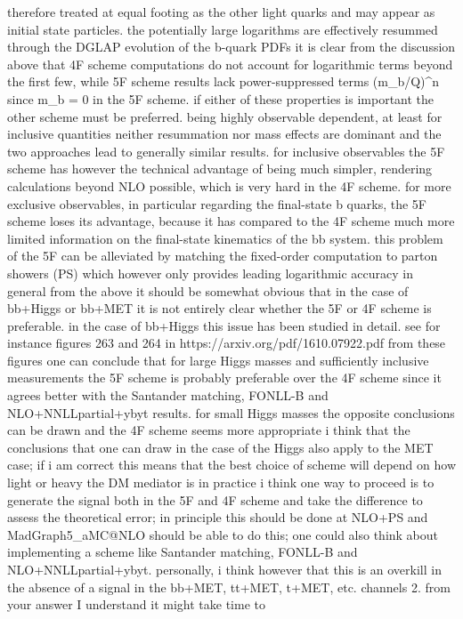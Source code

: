 {therefore treated at equal footing as the other light quarks and may
appear as initial state particles. the potentially large logarithms are
effectively resummed through the DGLAP evolution of the b-quark PDFs it
is clear from the discussion above that 4F scheme computations do not
account for logarithmic terms beyond the first few, while 5F scheme
results lack power-suppressed terms (m\_b/Q)\^{}n since m\_b = 0 in the
5F scheme. if either of these properties is important the other scheme
must be preferred. being highly observable dependent, at least for
inclusive quantities neither resummation nor mass effects are dominant
and the two approaches lead to generally similar results. for inclusive
observables the 5F scheme has however the technical advantage of being
much simpler, rendering calculations beyond NLO possible, which is very
hard in the 4F scheme. for more exclusive observables, in particular
regarding the final-state b quarks, the 5F scheme loses its advantage,
because it has compared to the 4F scheme much more limited information
on the final-state kinematics of the bb system. this problem of the 5F
can be alleviated by matching the fixed-order computation to parton
showers (PS) which however only provides leading logarithmic accuracy in
general from the above it should be somewhat obvious that in the case of
bb+Higgs or bb+MET it is not entirely clear whether the 5F or 4F scheme
is preferable. in the case of bb+Higgs this issue has been studied in
detail. see for instance figures 263 and 264 in
https://arxiv.org/pdf/1610.07922.pdf from these figures one can conclude
that for large Higgs masses and sufficiently inclusive measurements the
5F scheme is probably preferable over the 4F scheme since it agrees
better with the Santander matching, FONLL-B and NLO+NNLLpartial+ybyt
results. for small Higgs masses the opposite conclusions can be drawn
and the 4F scheme seems more appropriate i think that the conclusions
that one can draw in the case of the Higgs also apply to the MET case;
if i am correct this means that the best choice of scheme will depend on
how light or heavy the DM mediator is in practice i think one way to
proceed is to generate the signal both in the 5F and 4F scheme and take
the difference to assess the theoretical error; in principle this should
be done at NLO+PS and MadGraph5\_aMC@NLO should be able to do this; one
could also think about implementing a scheme like Santander matching,
FONLL-B and NLO+NNLLpartial+ybyt. personally, i think however that this
is an overkill in the absence of a signal in the bb+MET, tt+MET, t+MET,
etc. channels 2. from your answer I understand it might take time to
}
